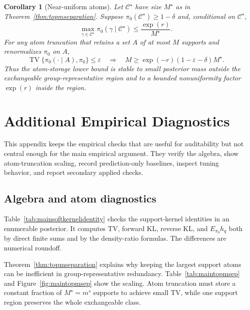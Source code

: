 \documentclass[twoside,11pt]{article}
\newtheorem{corollary}{Corollary}
\newcommand{\TV}{\operatorname{TV}}
\begin{document}
\begin{corollary}[Near-uniform atoms]
\label{cor:nearuniformtopm}
Let $\mathcal C^\star$ have size $M^\star$ as in Theorem~\ref{thm:topmseparation}. Suppose $\pi_0(\mathcal C^\star)\ge1-\delta$ and, conditional on $\mathcal C^\star$,
\[
\max_{\gamma\in\mathcal C^\star} \pi_0(\gamma\mid\mathcal C^\star) \le \frac{\exp(r)}{M^\star}.
\]
For any atom truncation that retains a set $A$ of at most $M$ supports and renormalizes $\pi_0$ on $A$,
\[
\TV\{\pi_0(\cdot\mid A),\pi_0\}\le\varepsilon \quad\Longrightarrow\quad M \ge \exp(-r)(1-\varepsilon-\delta)M^\star .
\]
Thus the atom-storage lower bound is stable to small posterior mass outside the exchangeable group-representative region and to a bounded nonuniformity factor $\exp(r)$ inside the region.
\end{corollary}

\section{Additional Empirical Diagnostics}
\label{app:empiricaldiagnostics}

This appendix keeps the empirical checks that are useful for auditability but not central enough for the main empirical argument. They verify the algebra, show atom-truncation scaling, record prediction-only baselines, inspect tuning behavior, and report secondary applied checks.

\subsection{Algebra and atom diagnostics}
\label{subsec:exactchecks}

Table~\ref{tab:mainsoftkernelidentity} checks the support-kernel identities in an enumerable posterior. It computes TV, forward KL, reverse KL, and \(E_{\pi_0}h_q\) both by direct finite sums and by the density-ratio formulas. The differences are numerical roundoff.

\begin{table}[!htbp]
\centering

\caption{Exact support-kernel identity validation.}
\label{tab:mainsoftkernelidentity}
\end{table}

Theorem~\ref{thm:topmseparation} explains why keeping the largest support atoms can be inefficient in group-representative redundancy. Table~\ref{tab:maintopmsep} and Figure~\ref{fig:maintopmsep} show the scaling. Atom truncation must store a constant fraction of \(M^\star=m^s\) supports to achieve small TV, while one support region preserves the whole exchangeable class.
\end{document}
